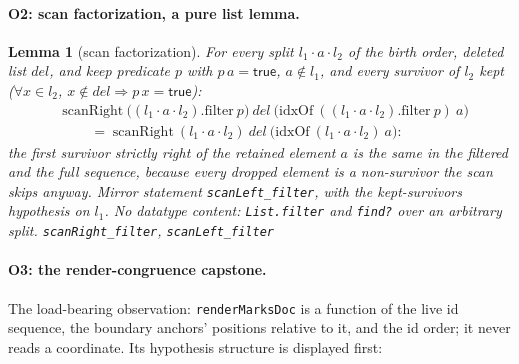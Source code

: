 \documentclass[11pt]{article}
\newtheorem{lemma}[theorem]{Lemma}
\newcommand{\lean}[1]{\texttt{#1}}
\begin{document}
\paragraph{O2: scan factorization, a pure list lemma.}

\begin{lemma}[scan factorization]
\label{lem:scanfactor}
For every split $l_1 \cdot a \cdot l_2$ of the birth order, deleted
list $\mathit{del}$, and keep predicate $p$ with $p\,a =
\mathsf{true}$, $a \notin l_1$, and every survivor of $l_2$ kept
($\forall x \in l_2$, $x \notin \mathit{del} \Rightarrow p\,x =
\mathsf{true}$):
\[
\begin{aligned}
  &\mathrm{scanRight}\ \bigl((l_1 \cdot a \cdot
  l_2).\mathrm{filter}\ p\bigr)\ \mathit{del}\
  \bigl(\mathrm{idxOf}\ ((l_1 \cdot a \cdot l_2).\mathrm{filter}\
  p)\ a\bigr) \\
  &\qquad=\;
  \mathrm{scanRight}\ (l_1 \cdot a \cdot l_2)\ \mathit{del}\
  \bigl(\mathrm{idxOf}\ (l_1 \cdot a \cdot l_2)\ a\bigr) :
\end{aligned}
\]
the first survivor strictly right of the retained element $a$ is the
same in the filtered and the full sequence, because every dropped
element is a non-survivor the scan skips anyway. Mirror statement
\lean{scanLeft\_filter}, with the kept-survivors hypothesis on $l_1$.
No datatype content: \lean{List.filter} and \lean{find?} over an
arbitrary split.
\hfill\lean{scanRight\_filter}, \lean{scanLeft\_filter}
\end{lemma}

\paragraph{O3: the render-congruence capstone.} The load-bearing
observation: \lean{renderMarksDoc} is a function of the live id
sequence, the boundary anchors' positions relative to it, and the id
order; it never reads a coordinate. Its hypothesis structure is
displayed first:
\end{document}
